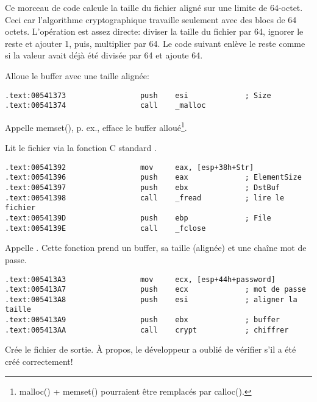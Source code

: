 

Ce morceau de code calcule la taille du fichier aligné sur une limite de 64-octet.
Ceci car l'algorithme cryptographique travaille seulement avec des blocs de 64 octets.
L'opération est assez directe: diviser la taille du fichier par 64, ignorer le reste
et ajouter 1, puis, multiplier par 64.
Le code suivant enlève le reste comme si la valeur avait déjà été divisée par 64
et ajoute 64.



Alloue le buffer avec une taille alignée:

\begin{lstlisting}[style=customasmx86]
.text:00541373                 push    esi             ; Size
.text:00541374                 call    _malloc
\end{lstlisting}

Appelle memset(), p. ex., efface le buffer alloué\footnote{malloc() + memset() pourraient
être remplacés par calloc().}.



Lit le fichier via la fonction C standard .

\begin{lstlisting}[style=customasmx86]
.text:00541392                 mov     eax, [esp+38h+Str]
.text:00541396                 push    eax             ; ElementSize
.text:00541397                 push    ebx             ; DstBuf
.text:00541398                 call    _fread          ; lire le fichier
.text:0054139D                 push    ebp             ; File
.text:0054139E                 call    _fclose
\end{lstlisting}

Appelle . Cette fonction prend un buffer, sa taille (alignée) et une chaîne
mot de passe.

\begin{lstlisting}[style=customasmx86]
.text:005413A3                 mov     ecx, [esp+44h+password]
.text:005413A7                 push    ecx             ; mot de passe
.text:005413A8                 push    esi             ; aligner la taille
.text:005413A9                 push    ebx             ; buffer
.text:005413AA                 call    crypt           ; chiffrer
\end{lstlisting}

Crée le fichier de sortie. À propos, le développeur a oublié de vérifier s'il a été
créé correctement!

